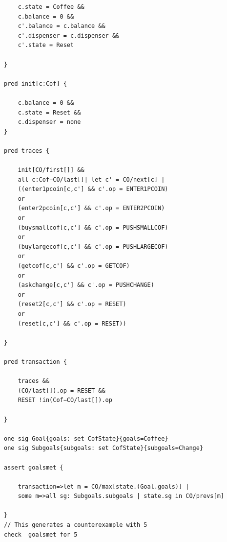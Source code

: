 \documentclass[a4paper,12pt]{report}
\begin{document}
\begin{verbatim}
	c.state = Coffee &&
	c.balance = 0 &&
	c'.balance = c.balance &&
	c'.dispenser = c.dispenser &&
	c'.state = Reset
	
}

pred init[c:Cof] {

	c.balance = 0 &&
	c.state = Reset &&
	c.dispenser = none
}

pred traces {

	init[CO/first[]] &&
	all c:Cof−CO/last[]| let c' = CO/next[c] |
	((enter1pcoin[c,c'] && c'.op = ENTER1PCOIN)
	or
	(enter2pcoin[c,c'] && c'.op = ENTER2PCOIN)
	or
	(buysmallcof[c,c'] && c'.op = PUSHSMALLCOF)
	or
	(buylargecof[c,c'] && c'.op = PUSHLARGECOF)
	or
	(getcof[c,c'] && c'.op = GETCOF)
	or
	(askchange[c,c'] && c'.op = PUSHCHANGE)
	or
	(reset2[c,c'] && c'.op = RESET)
	or
	(reset[c,c'] && c'.op = RESET))

}

pred transaction {

	traces &&
	(CO/last[]).op = RESET &&
	RESET !in(Cof−CO/last[]).op
	
}

one sig Goal{goals: set CofState}{goals=Coffee}
one sig Subgoals{subgoals: set CofState}{subgoals=Change}

assert goalsmet {

	transaction=>let m = CO/max[state.(Goal.goals)] |
	some m=>all sg: Subgoals.subgoals | state.sg in CO/prevs[m]

}
// This generates a counterexample with 5
check  goalsmet for 5

\end{verbatim}
\end{document}
